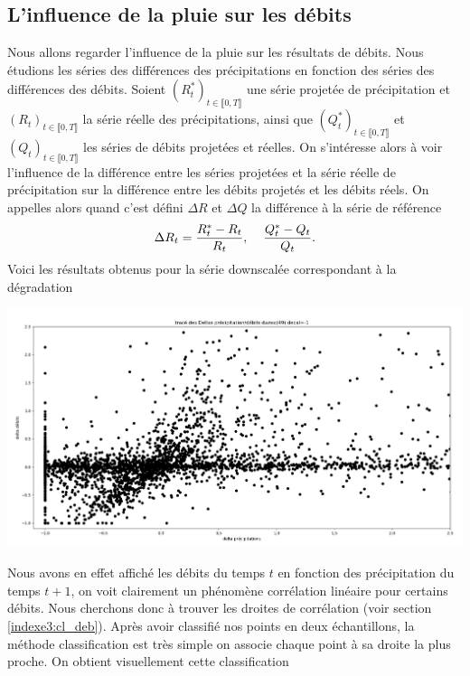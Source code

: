 \documentclass[a4paper,11pt]{article}
\begin{document}
\subsection{L'influence de la pluie sur les débits}
\label{ch:classification delta deb delta pluie}
Nous allons regarder l'influence de la pluie sur les résultats de débits. Nous étudions les séries des différences des précipitations en fonction des séries des différences des débits. Soient $(R^{*}_t)_{t \in \llbracket 0, T\rrbracket}$ une série projetée de précipitation et $(R_t)_{t \in \llbracket 0, T\rrbracket}$ la série réelle des précipitations, ainsi que $(Q^{*}_t)_{t \in \llbracket 0, T\rrbracket}$ et $(Q_t)_{t \in \llbracket 0, T\rrbracket}$ les séries de débits projetées et réelles. On s'intéresse alors à voir l'influence de la différence entre les séries projetées et la série réelle de précipitation sur la différence entre les débits projetés et les débits réels. On appelles alors quand c'est défini $\Delta R$ et $\Delta Q$ la différence à la série de référence 
\[\Delta R_t=\frac{R^{*}_t-R_t}{R_t}, \hspace{4mm} \frac{Q^{*}_t-Q_t}{Q_t}.\]
Voici les résultats obtenus pour la série downscalée correspondant à la dégradation  
    
\begin{center}
	\captionsetup{type=figure}
	\includegraphics[scale=0.25]{deb_prec_dec1.png}
\end{center}

Nous avons en effet affiché les débits du temps $t$ en fonction des précipitation du temps $t+1$, on voit clairement un phénomène corrélation linéaire pour certains débits. Nous cherchons donc à trouver les droites de corrélation (voir section \ref{indexe3:cl_deb}). Après avoir classifié nos points en deux échantillons, la méthode classification est très simple on associe chaque point à sa droite la plus proche. On obtient visuellement cette classification
\end{document}
